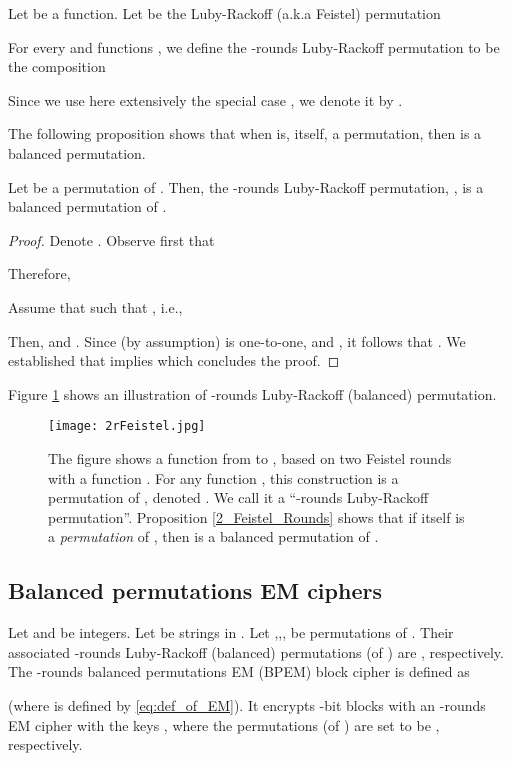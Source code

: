 \documentclass{llncs}
\begin{document}
\begin{definition}
Let  be a function. Let  be the Luby-Rackoff (a.k.a Feistel) permutation

For every  and  functions , we define the -rounds Luby-Rackoff permutation to be the composition

Since we use here extensively the special case , we denote it by .
\end{definition}

The following proposition shows that when  is, itself, a permutation, then  is a balanced permutation.

\begin{proposition}
Let  be a permutation of . Then, the -rounds Luby-Rackoff permutation, , is a balanced permutation of .
\label{2_Feistel_Rounds}
\end{proposition}

\begin{proof} Denote . Observe first that

Therefore,

Assume that  such that , i.e.,

Then,  and .
Since (by assumption)  is one-to-one,  and , it follows that
.
We established that  implies  which concludes the proof.
\end{proof}
Figure \ref{2rFeistel} shows an illustration of -rounds Luby-Rackoff (balanced) permutation.

\begin{figure}[ht!]
\centering
\texttt{[image: 2rFeistel.jpg]}
\caption{
The figure shows a function from  to , based on two Feistel rounds with a function . For any function , this construction is a permutation
of , denoted . We call it a ``-rounds Luby-Rackoff permutation''.
Proposition \ref{2_Feistel_Rounds} shows that if  itself is a {\it permutation} of , then
 is a balanced permutation of .}
\label{2rFeistel}
\end{figure}

\subsection{Balanced permutations EM ciphers}

\begin{definition}
Let  and  be integers. Let  be  strings in . Let ,,,  be  permutations of . Their associated -rounds Luby-Rackoff (balanced) permutations (of ) are , respectively. The -rounds balanced permutations EM (BPEM) block cipher is  defined as

(where  is defined by \eqref{eq:def_of_EM}).
It encrypts -bit blocks with an -rounds EM cipher with the keys , where the  permutations  (of ) are set to be  , respectively.
\end{definition}
\end{document}
